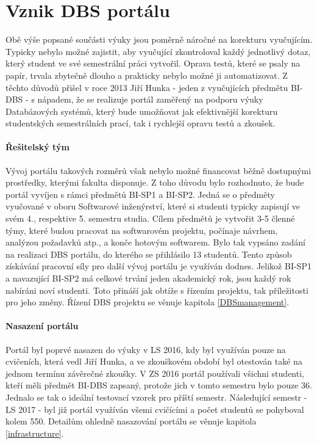 \section{Vznik DBS portálu} \label{DBSportal:creation}
Obě výše popsané součásti výuky jsou poměrně náročné na korekturu vyučujícím. Typicky nebylo možné zajistit, aby vyučující zkontroloval každý jednotlivý dotaz, který student ve své semestrální práci vytvořil. Oprava testů, které se psaly na papír, trvala zbytečně dlouho a prakticky nebylo možné ji automatizovat. Z těchto důvodů přišel v roce 2013 Jiří Hunka - jeden z vyučujících předmětu BI-DBS - s nápadem, že se realizuje portál zaměřený na podporu výuky Databázových systémů, který bude umožňovat jak efektivnější korekturu studentských semestrálních prací, tak i rychlejší opravu testů a zkoušek.

\paragraph{Řešitelský tým}
Vývoj portálu takových rozměrů však nebylo možné financovat běžně dostupnými prostředky, kterými fakulta disponuje. Z toho důvodu bylo rozhodnuto, že bude portál vyvíjen s rámci předmětů BI-SP1 a BI-SP2. Jedná se o předměty vyučované v oboru Softwarové inženýrství, které si studenti typicky zapisují ve svém 4., respektive 5. semestru studia. Cílem předmětů je vytvořit 3-5 členné týmy, které budou pracovat na softwarovém projektu, počínaje návrhem, analýzou požadavků atp., a konče hotovým softwarem. Bylo tak vypsáno zadání na realizaci DBS portálu, do kterého se přihlásilo 13 studentů.
Tento způsob získávání pracovní síly pro další vývoj portálu je využíván dodnes. Jelikož BI-SP1 a navazující BI-SP2 má celkové trvání jeden akademický rok, jsou každý rok nabíráni noví studenti. Toto přináší jak obtíže s řízením projektu, tak příležitosti pro jeho změny. Řízení DBS projektu se věnuje kapitola \ref{DBSmanagement}.

\paragraph{Nasazení portálu}
Portál byl poprvé nasazen do výuky v LS 2016, kdy byl využíván pouze na cvičeních, která vedl Jiří Hunka, a ve zkouškovém období byl otestován také na jednom termínu závěrečné zkoušky.
V ZS 2016 portál používali všichni studenti, kteří měli předmět BI-DBS zapsaný, protože jich v tomto semestru bylo pouze 36. Jednalo se tak o ideální testovací vzorek pro příští semestr. Následující semestr - LS 2017 - byl již portál využíván všemi cvičícími a počet studentů se pohyboval kolem 550. Detailům ohledně nasazování portálu se věnuje kapitola \ref{infrastructure}.

